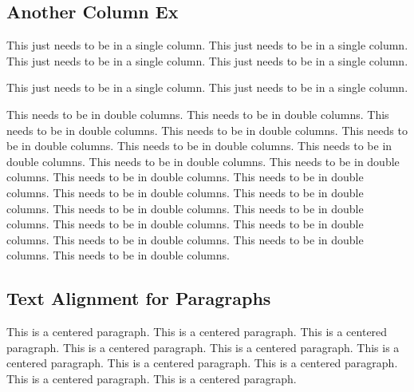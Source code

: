 \documentclass[12pt,twoside,a4paper]{article}
\begin{document}
\subsection*{Another Column Ex}
\par This just needs to be in a single column. This just needs to be in a single column. This just needs to be in a single column. This just needs to be in a single column. \par This just needs to be in a single column. This just needs to be in a single column.

\begin{multicols}{3}
  \setlength{\columnsep}{0.5cm}
  \setlength{\columnseprule}{0pt} %

\newline \noindent This needs to be in double columns. This needs to be in double columns.
\newline This needs to be in double columns. This needs to be in double columns.
\newline This needs to be in double columns. This needs to be in double columns.
\newline This needs to be in double columns. This needs to be in double columns.
\newline This needs to be in double columns. This needs to be in double columns.
\newline This needs to be in double columns. This needs to be in double columns.
\newline This needs to be in double columns. This needs to be in double columns.
\newline This needs to be in double columns. This needs to be in double columns.
\newline This needs to be in double columns. This needs to be in double columns.
\newline This needs to be in double columns. This needs to be in double columns.
\end{multicols}

\newpage

\begin{center}
\subsection*{Text Alignment for Paragraphs}
This is a centered paragraph. This is a centered paragraph. This is a centered paragraph. This is a centered paragraph. This is a centered paragraph. This is a centered paragraph. This is a centered paragraph. This is a centered paragraph. This is a centered paragraph. This is a centered paragraph.
\end{center}
\end{document}
